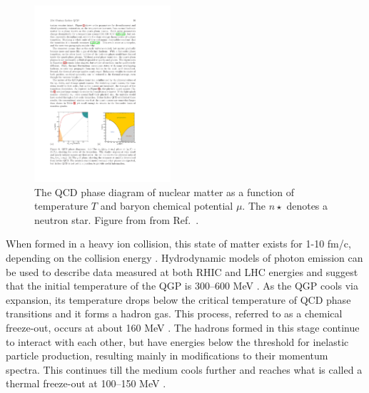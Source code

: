 \begin{figure}[htbp]
\begin{center}
\includegraphics[width=0.45\textwidth]{figures/theory/qcd_phase}
\caption{The QCD phase diagram of nuclear matter as a function of temperature $T$ and baryon chemical potential $\mu$.
The $n\star$ denotes a neutron star.
Figure from from Ref.~\cite{Kronfeld:2012uk}.}
\label{fig:qcd_phase}
\end{center}
\end{figure}

When formed in a heavy ion collision, this state of matter exists for 1-10 fm/c, depending on the collision energy \cite{doi:10.1146/annurev.nucl.46.1.71}.
Hydrodynamic models of photon emission can be used to describe data measured at both RHIC \cite{PhysRevLett.104.132301} and LHC \cite{2016235} energies and suggest that the initial temperature of the QGP is 300--600 MeV \cite{PhysRevC.81.034911}.
As the QGP cools via expansion, its temperature drops below the critical temperature of QCD phase transitions and it forms a hadron gas.
This process, referred to as a chemical freeze-out, occurs at about 160 MeV \cite{Fodor_2004, ADAMS2005102, PhysRevC.93.024917}.
The hadrons formed in this stage continue to interact with each other, but have energies below the threshold for inelastic particle production, resulting mainly in modifications to their momentum spectra.
This continues till the medium cools further and reaches what is called a thermal freeze-out at 100--150 MeV \cite{PhysRevC.69.024904, PhysRevC.72.014908, PhysRevC.75.024910, PhysRevC.88.044910}.


